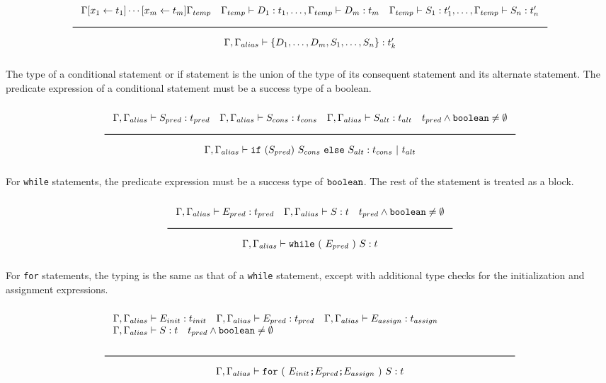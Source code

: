 \noindent
\[
  \Rule{\Gamma [x_1 \leftarrow t_1] \cdots [x_m \leftarrow t_m] \Gamma_{temp} \quad
    \Gamma_{temp} \vdash D_1 : t_1, \ldots, \Gamma_{temp} \vdash D_m : t_m \quad
    \Gamma_{temp} \vdash S_1 : t'_1, \ldots, \Gamma_{temp} \vdash S_n : t'_n
    }{\Gamma, \Gamma_{alias} \vdash \{ D_1, \ldots, D_m, S_1, \ldots, S_n\} : t'_k}
\]
\noindent

The type of a conditional statement or if statement is the union of the type of its consequent statement and its alternate statement.
The predicate expression of a conditional statement must be a success type of a boolean.

\noindent
\[
  \Rule{\Gamma, \Gamma_{alias} \vdash S_{pred} : t_{pred} \quad \Gamma, \Gamma_{alias} \vdash S_{cons} : t_{cons} \quad \Gamma, \Gamma_{alias} \vdash S_{alt} : t_{alt}
    \quad t_{pred} \wedge \Bool \neq \emptyset}{\Gamma, \Gamma_{alias} \vdash \texttt{if}\ (S_{pred})\ S_{cons}\
    \texttt{else}\ S_{alt} : t_{cons}\ |\ t_{alt}}
\]
\noindent

For \texttt{while} statements, the predicate expression must be a success type of $\texttt{boolean}$. The rest of the statement is treated as a block.

\noindent
\[
  \Rule{\Gamma, \Gamma_{alias} \vdash E_{pred} : t_{pred} \quad \Gamma, \Gamma_{alias} \vdash S : t \quad t_{pred} \wedge \Bool \neq \emptyset}{
    \Gamma, \Gamma_{alias} \vdash \texttt{while}\ (\ E_{pred}\ )\ S : t}
\]
\noindent

For \texttt{for} statements, the typing is the same as that of a \texttt{while} statement,
except with additional type checks for the initialization and assignment expressions.

\noindent
\[
  \Rule{\begin{minipage}{140mm}
    $\Gamma, \Gamma_{alias} \vdash E_{init} : t_{init} \quad \Gamma, \Gamma_{alias} \vdash E_{pred} : t_{pred} \quad
    \Gamma, \Gamma_{alias} \vdash E_{assign} : t_{assign} \quad$ \\
    $\Gamma, \Gamma_{alias} \vdash S : t \quad t_{pred} \wedge \Bool \neq \emptyset$\\
    \end{minipage}}{
    \Gamma, \Gamma_{alias} \vdash \texttt{for}\ (\ E_{init} \texttt{;} E_{pred} \texttt{;} E_{assign}\ )\ S : t}
\]
\noindent
